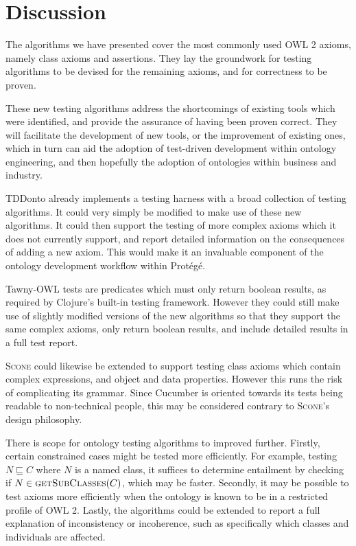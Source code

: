 \documentclass[paper.tex]{subfiles}
\begin{document}
\section{Discussion}
\label{sec:discussion}

The algorithms we have presented cover the most commonly used OWL 2 axioms, namely class axioms and assertions. 
They lay the groundwork for testing algorithms to be devised for the remaining axioms, and for correctness to be proven.

These new testing algorithms address the shortcomings of existing tools which were identified, and provide the assurance of having been proven correct.
They will facilitate the development of new tools, or the improvement of existing ones, which in turn can aid the adoption of test-driven development within ontology engineering, and then hopefully the adoption of ontologies within business and industry.

TDDonto already implements a testing harness with a broad collection of testing algorithms.
It could very simply be modified to make use of these new algorithms.
It could then support the testing of more complex axioms which it does not currently support, and report detailed information on the consequences of adding a new axiom.
This would make it an invaluable component of the ontology development workflow within Prot\'eg\'e.

Tawny-OWL tests are predicates which must only return boolean results, as required by Clojure's built-in testing framework.
However they could still make use of slightly modified versions of the new algorithms so that they support the same complex axioms, only return boolean results, and include detailed results in a full test report.

\textsc{Scone} could likewise be extended to support testing class axioms which contain complex expressions, and object and data properties.
However this runs the risk of complicating its grammar.
Since Cucumber is oriented towards its tests being readable to non-technical people, this may be considered contrary to \textsc{Scone}'s design philosophy.

There is scope for ontology testing algorithms to improved further.
Firstly, certain constrained cases might be tested more efficiently.
For example, testing $N \sqsubseteq C$ where $N$ is a named class, it suffices to determine entailment by checking if $N \in \Call{getSubClasses}{C}$, which may be faster.
Secondly, it may be possible to test axioms more efficiently when the ontology is known to be in a restricted profile of OWL 2.
Lastly, the algorithms could be extended to report a full explanation of inconsistency or incoherence, such as specifically which classes and individuals are affected.
\end{document}
